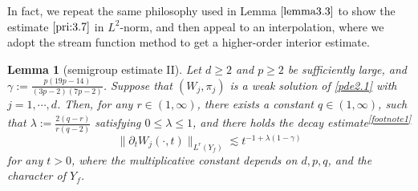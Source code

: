 \documentclass[13pt,CJK]{article}
\theoremstyle{plain}                       %
\newtheorem{lemma}{Lemma}[section]
\theoremstyle{remark}
\numberwithin{equation}{section}
\begin{document}
\noindent
In fact, we repeat the same philosophy used in Lemma $\ref{lemma3.3}$
to show the estimate $\eqref{pri:3.7}$ in $L^2$-norm, and then appeal
to an interpolation, where we adopt the stream function method to get a higher-order interior estimate.

\begin{lemma}[semigroup estimate II]\label{lemma2.2}
Let $d\geq 2$ and $p\geq 2$ be sufficiently large, and $\gamma:=\frac{p(19p-14)}{(3p-2)(7p-2)}$.
Suppose that $(W_j,\pi_j)$ is a weak solution of \eqref{pde2.1} with $j=1,\cdots,d$.
Then, for any $r\in(1,\infty)$,
there exists a constant $q\in(1,\infty)$, such that
$\lambda:=\frac{2(q-r)}{r(q-2)}$ satisfying $0\leq\lambda\leq 1$,
and there holds the decay estimate\textsuperscript{\ref{footnote1}}
\begin{equation}\label{pri:3.7}
\|\partial_t W_j(\cdot,t)\|_{L^r(Y_f)}\lesssim t^{-1+\lambda(1-\gamma)}
\end{equation}
for any $t>0$, where the multiplicative constant depends on $d,p,q$, and the character of $Y_f$.
\end{lemma}
\end{document}

